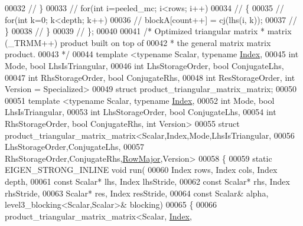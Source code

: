 \begin{DoxyCode}
00032 \textcolor{comment}{//     \}}
00033 \textcolor{comment}{//     for(int i=peeled\_mc; i<rows; i++)}
00034 \textcolor{comment}{//     \{}
00035 \textcolor{comment}{//       for(int k=0; k<depth; k++)}
00036 \textcolor{comment}{//         blockA[count++] = cj(lhs(i, k));}
00037 \textcolor{comment}{//     \}}
00038 \textcolor{comment}{//   \}}
00039 \textcolor{comment}{// \};}
00040 
00041 \textcolor{comment}{/* Optimized triangular matrix * matrix (\_TRMM++) product built on top of}
00042 \textcolor{comment}{ * the general matrix matrix product.}
00043 \textcolor{comment}{ */}
00044 \textcolor{keyword}{template} <\textcolor{keyword}{typename} Scalar, \textcolor{keyword}{typename} \hyperlink{namespace_eigen_a62e77e0933482dafde8fe197d9a2cfde}{Index},
00045           \textcolor{keywordtype}{int} Mode, \textcolor{keywordtype}{bool} LhsIsTriangular,
00046           \textcolor{keywordtype}{int} LhsStorageOrder, \textcolor{keywordtype}{bool} ConjugateLhs,
00047           \textcolor{keywordtype}{int} RhsStorageOrder, \textcolor{keywordtype}{bool} ConjugateRhs,
00048           \textcolor{keywordtype}{int} ResStorageOrder, \textcolor{keywordtype}{int} Version = Specialized>
00049 \textcolor{keyword}{struct }product\_triangular\_matrix\_matrix;
00050 
00051 \textcolor{keyword}{template} <\textcolor{keyword}{typename} Scalar, \textcolor{keyword}{typename} \hyperlink{namespace_eigen_a62e77e0933482dafde8fe197d9a2cfde}{Index},
00052           \textcolor{keywordtype}{int} Mode, \textcolor{keywordtype}{bool} LhsIsTriangular,
00053           \textcolor{keywordtype}{int} LhsStorageOrder, \textcolor{keywordtype}{bool} ConjugateLhs,
00054           \textcolor{keywordtype}{int} RhsStorageOrder, \textcolor{keywordtype}{bool} ConjugateRhs, \textcolor{keywordtype}{int} Version>
00055 \textcolor{keyword}{struct }product\_triangular\_matrix\_matrix<Scalar,Index,Mode,LhsIsTriangular,
00056                                            LhsStorageOrder,ConjugateLhs,
00057                                            RhsStorageOrder,ConjugateRhs,\hyperlink{group__enums_ggaacded1a18ae58b0f554751f6cdf9eb13acfcde9cd8677c5f7caf6bd603666aae3}{RowMajor},Version>
00058 \{
00059   \textcolor{keyword}{static} EIGEN\_STRONG\_INLINE \textcolor{keywordtype}{void} run(
00060     Index rows, Index cols, Index depth,
00061     \textcolor{keyword}{const} Scalar* lhs, Index lhsStride,
00062     \textcolor{keyword}{const} Scalar* rhs, Index rhsStride,
00063     Scalar* res,       Index resStride,
00064     \textcolor{keyword}{const} Scalar& alpha, level3\_blocking<Scalar,Scalar>& blocking)
00065   \{
00066     product\_triangular\_matrix\_matrix<Scalar, \hyperlink{namespace_eigen_a62e77e0933482dafde8fe197d9a2cfde}{Index},

\end{DoxyCode}
